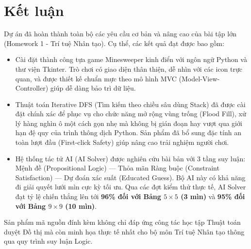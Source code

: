 \section{Kết luận}

Dự án đã hoàn thành toàn bộ các yêu cầu cơ bản và nâng cao của bài tập lớn (Homework 1 - Trí tuệ Nhân tạo). Cụ thể, các kết quả đạt được bao gồm:

\begin{itemize}
    \item Cài đặt thành công tựa game Minesweeper kinh điển với ngôn ngữ Python và thư viện Tkinter. Trò chơi có giao diện thân thiện, dễ nhìn với các icon trực quan, và được thiết kế chuẩn mực theo mô hình MVC (Model-View-Controller) giúp dễ dàng bảo trì dữ liệu.
    \item Thuật toán Iterative DFS (Tìm kiếm theo chiều sâu dùng Stack) đã được cài đặt chính xác để phục vụ cho chức năng mở rộng vùng trống (Flood Fill), xử lý hàng nghìn ô một cách gọn nhẹ mà không bị gián đoạn hay vượt qua giới hạn đệ quy của trình thông dịch Python. Sản phẩm đã bổ sung đặc tính an toàn lượt đầu (First-click Safety) giúp nâng cao trải nghiệm người chơi.
    \item Hệ thống tác tử AI (AI Solver) được nghiên cứu bài bản với 3 tầng suy luận: Mệnh đề (Propositional Logic) — Thỏa mãn Ràng buộc (Constraint Satisfaction) — Dự đoán xác suất (Educated Guess). Bộ AI này có khả năng đi giải quyết lưới mìn cực kỳ tối ưu. Qua các đợt kiểm thử thực tế, AI Solver đạt tỷ lệ chiến thắng lên tới \textbf{96\% đối với Bảng $5\times5$ (3 mìn)} và \textbf{95\% đối với Bảng $9\times9$ (10 mìn)}.
\end{itemize}

Sản phẩm mã nguồn đính kèm không chỉ đáp ứng công tác học tập Thuật toán duyệt Đồ thị mà còn minh họa thực tế nhất cho bộ môn Trí tuệ Nhân tạo thông qua quy trình suy luận Logic.
